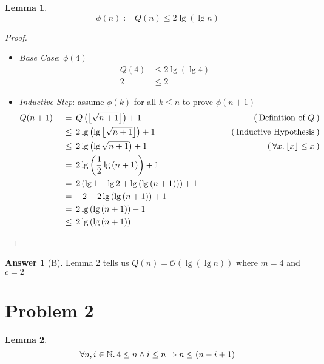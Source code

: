 \documentclass{article}
\newtheorem{lemma}{Lemma}
\theoremstyle{definition}
\newtheorem*{answer}{Answer}
\DeclarePairedDelimiter\floor{\lfloor}{\rfloor}
\newcommand{\evidence}[1]{\ensuremath{\hspace{3em} (\hspace{0.2em} \text{#1} \hspace{0.2em})}}
\newcommand{\asymptotic}[3]{\ensuremath{#2 = #1(#3)}}
\newcommand{\bigO}[2]{\asymptotic{\mathcal{O}}{#1}{#2}}
\newcommand{\relation}[1]{\ensuremath{\hspace{0.2em} {{} #1 {}} \hspace{0.2em}}}
\newcommand{\equal}{\relation{=}}
\newcommand{\lesseq}{\relation{\le}}
\newcommand{\parens}[1]{\left(#1\right)}
\newcommand{\lglg}[1]{\ensuremath{\lg{\parens{\lg{#1}}}}}
\newcommand{\quantify}[2]{\ensuremath{\forall #1 \in \mathbb{#2}. \hspace{0.2em}}}
\begin{document}
\begin{lemma}
  \begin{equation*}
    \phi(n) := Q(n) \le 2\lglg{n}
  \end{equation*}
\end{lemma}
\begin{proof}
  \hfill
  \begin{itemize}
  \item
    \textit{Base Case}: $\phi(4)$
    \begin{align*}
      Q(4) &\le 2\lglg{4} \\
      2 &\le 2
    \end{align*}
  \item
    \textit{Inductive Step}: assume $\phi(k)$ for all $k \le n$ to prove $\phi(n + 1)$
    \begin{alignat*}{4}
      & Q(n + 1) & \equal & Q\left(\floor*{\sqrt{n + 1}}\right) + 1 & \evidence{Definition of $Q$} \\
      & {}       & \lesseq & 2\lglg{\floor*{\sqrt{n + 1}}} + 1       & \evidence{Inductive Hypothesis} \\
      & {}       & \lesseq & 2\lglg{\sqrt{n + 1}} + 1                & \evidence{$\forall x. \hspace{0.2em} \floor*{x} \le x$} \\
      & {}       & \equal  & 2\lg{\parens{\frac{1}{2}\lg{\parens{n + 1}}}} + 1     & {} \\
      & {}       & \equal  & 2\parens{\lg{1} - \lg{2} + \lglg{\parens{n + 1}}} + 1 & {} \\
      & {}       & \equal  & {-2} + 2\lglg{\parens{n + 1}} + 1                     & {} \\
      & {}       & \equal  & 2\lglg{\parens{n + 1}} - 1                            & {} \\
      & {}       & \lesseq & 2\lglg{\parens{n + 1}}                                & \qedhere
    \end{alignat*}
  \end{itemize}
\end{proof}
\begin{answer}[B]
  Lemma 2 tells us $\bigO{Q(n)}{\lglg{n}}$ where $m = 4$ and $c = 2$
\end{answer}

\section*{Problem 2}

\begin{lemma}
  \begin{equation*}
    \quantify{n, i}{N} 4 \le n \wedge i \le n \Rightarrow n \le (n - i + 1)
  \end{equation*} 
\end{lemma} 
\end{document}
